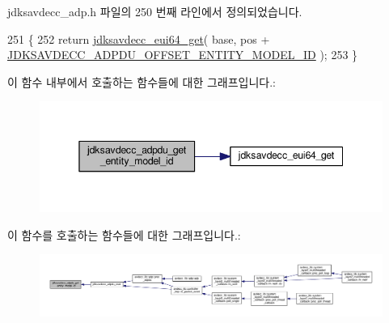 jdksavdecc\+\_\+adp.\+h 파일의 250 번째 라인에서 정의되었습니다.


\begin{DoxyCode}
251 \{
252     \textcolor{keywordflow}{return} \hyperlink{group__eui64_ga2652311a25a6b91cddbed75c108c7031}{jdksavdecc\_eui64\_get}( base, pos + 
      \hyperlink{group__adpdu_ga96883aa53d14212ddf4776937800de98}{JDKSAVDECC\_ADPDU\_OFFSET\_ENTITY\_MODEL\_ID} );
253 \}
\end{DoxyCode}


이 함수 내부에서 호출하는 함수들에 대한 그래프입니다.\+:
\nopagebreak
\begin{figure}[H]
\begin{center}
\leavevmode
\includegraphics[width=345pt]{group__adpdu_ga25d17e8d5b3485c16ca7cba7595d2271_cgraph}
\end{center}
\end{figure}




이 함수를 호출하는 함수들에 대한 그래프입니다.\+:
\nopagebreak
\begin{figure}[H]
\begin{center}
\leavevmode
\includegraphics[width=350pt]{group__adpdu_ga25d17e8d5b3485c16ca7cba7595d2271_icgraph}
\end{center}
\end{figure}


